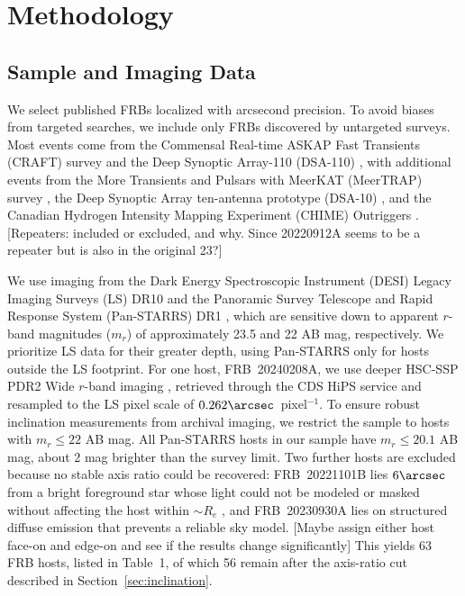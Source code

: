 \documentclass[apjl, linenumbers]{aastex701}
\begin{document}
\section{Methodology} \label{sec:methods}
\subsection{Sample and Imaging Data} \label{sec:sample}

We select published FRBs localized with arcsecond precision. To avoid biases from targeted searches, we include only FRBs discovered by untargeted surveys. Most events come from the Commensal Real-time ASKAP Fast Transients (CRAFT) survey \citep{CRAFT} and the Deep Synoptic Array-110 (DSA-110) \citep{DSA110}, with additional events from the More Transients and Pulsars with MeerKAT (MeerTRAP) survey \citep{MeerTrap}, the Deep Synoptic Array ten-antenna prototype (DSA-10) \citep{DSA10}, and the Canadian Hydrogen Intensity Mapping Experiment (CHIME) Outriggers \citep{CHIMEOutriggers}. [Repeaters: included or excluded, and why. Since 20220912A seems to be a repeater but is also in the original 23?]

We use imaging from the Dark Energy Spectroscopic Instrument (DESI) Legacy Imaging Surveys (LS) DR10 \citep{Desi} and the Panoramic Survey Telescope and Rapid Response System (Pan-STARRS) DR1 \citep{PS1}, which are sensitive down to apparent $r$-band magnitudes ($m_r$) of approximately 23.5 and 22 AB mag, respectively. We prioritize LS data for their greater depth, using Pan-STARRS only for hosts outside the LS footprint. For one host, FRB~20240208A, we use deeper HSC-SSP PDR2 Wide $r$-band imaging \citep{HS-SCSSP}, retrieved through the CDS HiPS service \citep{Fernique2015} and resampled to the LS pixel scale of $0.262\arcsec$~pixel$^{-1}$. To ensure robust inclination measurements from archival imaging, we restrict the sample to hosts with $m_r \leq 22$ AB mag. All Pan-STARRS hosts in our sample have $m_r \leq 20.1$ AB mag, about 2 mag brighter than the survey limit. Two further hosts are excluded because no stable axis ratio could be recovered: FRB~20221101B lies $6\arcsec$ from a bright foreground star whose light could not be modeled or masked without affecting the host within $\sim R_e$ \citep[as in][]{Japelij2018}, and FRB~20230930A lies on structured diffuse emission that prevents a reliable sky model. [Maybe assign either host face-on and edge-on and see if the results change significantly] This yields 63 FRB hosts, listed in Table~1, of which 56 remain after the axis-ratio cut described in Section~\ref{sec:inclination}.
\end{document}
